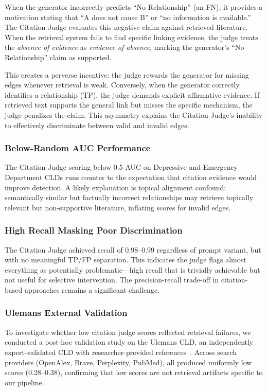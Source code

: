 When the generator incorrectly predicts ``No Relationship'' (an FN), it provides a motivation stating that ``A does not cause B'' or ``no information is available.'' The Citation Judge evaluates this negative claim against retrieved literature. When the retrieval system fails to find specific linking evidence, the judge treats the \textit{absence of evidence} as \textit{evidence of absence}, marking the generator's ``No Relationship'' claim as supported.

This creates a perverse incentive: the judge rewards the generator for missing edges whenever retrieval is weak. Conversely, when the generator correctly identifies a relationship (TP), the judge demands explicit affirmative evidence. If retrieved text supports the general link but misses the specific mechanism, the judge penalizes the claim. This asymmetry explains the Citation Judge's inability to effectively discriminate between valid and invalid edges.

\subsubsection{Below-Random AUC Performance}

The Citation Judge scoring below 0.5 AUC on Depressive and Emergency Department CLDs runs counter to the expectation that citation evidence would improve detection. A likely explanation is topical alignment confound: semantically similar but factually incorrect relationships may retrieve topically relevant but non-supportive literature, inflating scores for invalid edges.

\subsubsection{High Recall Masking Poor Discrimination}

The Citation Judge achieved recall of 0.98--0.99 regardless of prompt variant, but with no meaningful TP/FP separation. This indicates the judge flags almost everything as potentially problematic---high recall that is trivially achievable but not useful for selective intervention. The precision-recall trade-off in citation-based approaches remains a significant challenge.

\subsubsection{Ulemans External Validation}

To investigate whether low citation judge scores reflected retrieval failures, we conducted a post-hoc validation study on the Ulemans CLD, an independently expert-validated CLD with researcher-provided references~\citep{uleman2021mapping}. Across search providers (OpenAlex, Brave, Perplexity, PubMed), all produced uniformly low scores (0.28--0.38), confirming that low scores are not retrieval artifacts specific to our pipeline.

